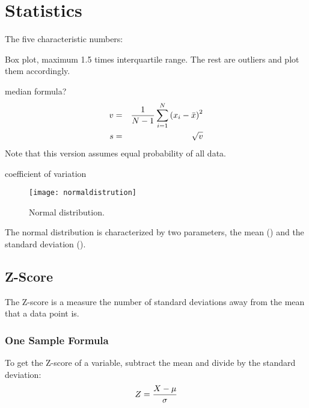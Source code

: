 	\chapter{Statistics}

The five characteristic numbers:
	\begin{plainlist}
		\item \xsmallest{}
		\item \quartileone{}
		\item \quartiletwo{}
		\item \quartilethree{}
		\item \xlargest{}
	\end{plainlist}

Box plot, maximum 1.5 times interquartile range.  The rest are outliers and plot them accordingly.



median formula?
	\begin{eqnarray}
		\mbox{$v$} 					& = & \frac{1}{N-1}\sum^N_{i=1}\left(x_i - \mbox{$\bar{x}$}\right)^2 \\
		\mbox{$s$}	& = & \sqrt{\mbox{$v$}}
	\end{eqnarray}
Note that this version assumes equal probability of all data.



coefficient of variation

	\begin{figure}[tbp]
		\centering
		\texttt{[image: normaldistrution]}
		\caption{Normal distribution.}
		\label{fig:normaldistrution}
	\end{figure}

The normal distribution is characterized by two parameters, the mean (\populationmean) and the standard deviation (\populationstandarddeviation).

	\section{Z-Score}
The Z-score is a measure the number of standard deviations away from the mean that a data point is.

	\subsection{One Sample Formula}
To get the Z-score of a variable, subtract the mean and divide by the standard deviation:
	\begin{equation}
		Z = \frac{X-\mbox{$\mu$}}{\mbox{$\sigma$}}
	\end{equation}
	\begin{mathwhere}
	\end{mathwhere}

